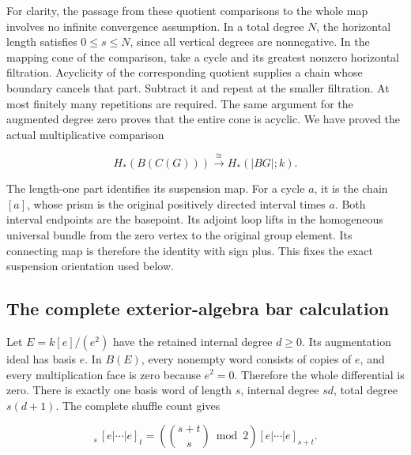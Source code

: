 For clarity, the passage from these quotient comparisons to the whole map involves no infinite convergence assumption. In a total degree \(N\), the horizontal length satisfies \(0\leq s\leq N\), since all vertical degrees are nonnegative. In the mapping cone of the comparison, take a cycle and its greatest nonzero horizontal filtration. Acyclicity of the corresponding quotient supplies a chain whose boundary cancels that part. Subtract it and repeat at the smaller filtration. At most finitely many repetitions are required. The same argument for the augmented degree zero proves that the entire cone is acyclic. We have proved the actual multiplicative comparison

\begin{equation}
H_*(B(C(G)))\xrightarrow{\cong}H_*(|BG|;k).
\label{courseIII:the-actual-mod-two-cooperation-comparison-through-degree-eight:eq:2.9}
\end{equation}

The length-one part identifies its suspension map. For a cycle \(a\), it is the chain \([a]\), whose prism is the original positively directed interval times \(a\). Both interval endpoints are the basepoint. Its adjoint loop lifts in the homogeneous universal bundle from the zero vertex to the original group element. Its connecting map is therefore the identity with sign plus. This fixes the exact suspension orientation used below.

\subsection{The complete exterior-algebra bar calculation}
\label{courseIII:the-actual-mod-two-cooperation-comparison-through-degree-eight:actual-eight-exterior-bar}

\label{courseIII:the-actual-mod-two-cooperation-comparison-through-degree-eight:section-3}\label{courseIII:actual-degree8:3}

Let \(E=k[e]/(e^2)\) have the retained internal degree \(d\geq0\). Its augmentation ideal has basis \(e\). In \(B(E)\), every nonempty word consists of copies of \(e\), and every multiplication face is zero because \(e^2=0\). Therefore the whole differential is zero. There is exactly one basis word of length \(s\), internal degree \(sd\), total degree \(s(d+1)\). The complete shuffle count gives

\begin{equation}
[e|\cdots|e]_s\,[e|\cdots|e]_t
 =\left(\binom{s+t}{s}\bmod2\right)[e|\cdots|e]_{s+t}.
\label{courseIII:the-actual-mod-two-cooperation-comparison-through-degree-eight:eq:3.1}
\end{equation}

